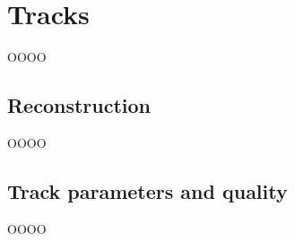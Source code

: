 \section{Tracks}
\label{heading:Chapter6-section10-1}

OOOO

\subsection{Reconstruction}
\label{heading:Chapter6-section10-2}

OOOO

\subsection{Track parameters and quality}
\label{heading:Chapter6-section10-3}

OOOO

